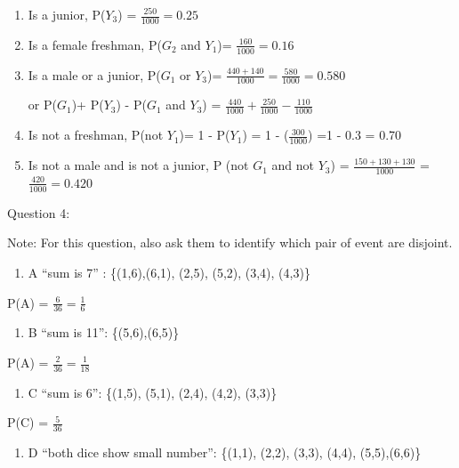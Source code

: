 \documentclass[
]{book}
\providecommand{\tightlist}{%
  \setlength{\itemsep}{0pt}\setlength{\parskip}{0pt}}
\begin{document}
\begin{enumerate}
\def\labelenumi{\alph{enumi})}
\item
  Is a junior, P(\(Y_3\)) = \(\frac{250}{1000}=0.25\)
\item
  Is a female freshman, P(\(G_2\) and \(Y_1\))= \(\frac{160}{1000}=0.16\)
\item
  Is a male or a junior, P(\(G_1\) or \(Y_3\))= \(\frac{440+140}{1000}=\frac{580}{1000}=0.580\)

  or P(\(G_1\))+ P(\(Y_3\)) - P(\(G_1\) and \(Y_3\)) = \(\frac{440}{1000}+\frac{250}{1000}-\frac{110}{1000}\)
\item
  Is not a freshman, P(not \(Y_1\))= 1 - P(\(Y_1\)) = 1 - (\(\frac{300}{1000}\)) =1 - 0.3 = 0.70
\item
  Is not a male and is not a junior, P (not \(G_1\) and not \(Y_3\)) = \(\frac{150+130+130}{1000}\) = \(\frac{420}{1000}=0.420\)
\end{enumerate}

Question 4:

Note: For this question, also ask them to identify which pair of event are disjoint.

\begin{enumerate}
\def\labelenumi{\alph{enumi})}
\tightlist
\item
  A ``sum is 7'' : \{(1,6),(6,1), (2,5), (5,2), (3,4), (4,3)\}
\end{enumerate}

P(A) = \(\frac{6}{36}=\frac{1}{6}\)

\begin{enumerate}
\def\labelenumi{\alph{enumi})}
\setcounter{enumi}{1}
\tightlist
\item
  B ``sum is 11'': \{(5,6),(6,5)\}
\end{enumerate}

P(A) = \(\frac{2}{36}=\frac{1}{18}\)

\begin{enumerate}
\def\labelenumi{\alph{enumi})}
\setcounter{enumi}{2}
\tightlist
\item
  C ``sum is 6'': \{(1,5), (5,1), (2,4), (4,2), (3,3)\}
\end{enumerate}

P(C) = \(\frac{5}{36}\)

\begin{enumerate}
\def\labelenumi{\alph{enumi})}
\setcounter{enumi}{3}
\tightlist
\item
  D ``both dice show small number'': \{(1,1), (2,2), (3,3), (4,4), (5,5),(6,6)\}
\end{enumerate}
\end{document}
